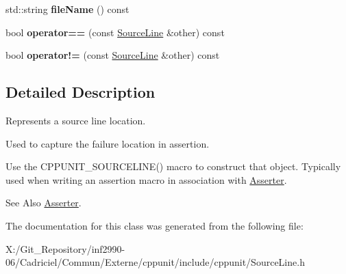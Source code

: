 \begin{DoxyCompactItemize}
\item 
\hypertarget{class_source_line_a1571a51d45ebcea382b86224ef767a2e}{std\-::string {\bfseries file\-Name} () const }\label{class_source_line_a1571a51d45ebcea382b86224ef767a2e}

\item 
\hypertarget{class_source_line_a6c9eff68161f364725b3a51fc60c3e01}{bool {\bfseries operator==} (const \hyperlink{class_source_line}{Source\-Line} \&other) const }\label{class_source_line_a6c9eff68161f364725b3a51fc60c3e01}

\item 
\hypertarget{class_source_line_aa4633f46f9c9f470c6b680327d002e86}{bool {\bfseries operator!=} (const \hyperlink{class_source_line}{Source\-Line} \&other) const }\label{class_source_line_aa4633f46f9c9f470c6b680327d002e86}

\end{DoxyCompactItemize}


\subsection{Detailed Description}
Represents a source line location.

Used to capture the failure location in assertion. 

Use the C\-P\-P\-U\-N\-I\-T\-\_\-\-S\-O\-U\-R\-C\-E\-L\-I\-N\-E() macro to construct that object. Typically used when writing an assertion macro in association with \hyperlink{struct_asserter}{Asserter}.

\begin{DoxySeeAlso}{See Also}
\hyperlink{struct_asserter}{Asserter}. 
\end{DoxySeeAlso}


The documentation for this class was generated from the following file\-:\begin{DoxyCompactItemize}
\item 
X\-:/\-Git\-\_\-\-Repository/inf2990-\/06/\-Cadriciel/\-Commun/\-Externe/cppunit/include/cppunit/Source\-Line.\-h\end{DoxyCompactItemize}
